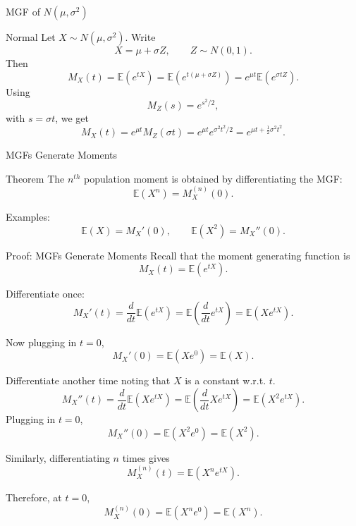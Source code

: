 \begin{frame}{MGF of $N(\mu,\sigma^2)$}

\small

\begin{keybox}{Normal}
Let \(X\sim N(\mu,\sigma^2)\). Write
\[
X=\mu+\sigma Z,
\qquad Z\sim N(0,1).
\]
Then
\[
M_X(t)
=
\mathbb{E}(e^{tX})
=
\mathbb{E}\left(e^{t(\mu+\sigma Z)}\right)
=
e^{\mu t}\mathbb{E}(e^{\sigma t Z}).
\]
Using
\[
M_Z(s)=e^{s^2/2},
\]
with \(s=\sigma t\), we get
\[
M_X(t)
=
e^{\mu t}M_Z(\sigma t)
=
e^{\mu t}e^{\sigma^2t^2/2}
=
{e^{\mu t+\frac12\sigma^2t^2}}.
\]
\end{keybox}

\end{frame}



































\begin{frame}{MGFs Generate Moments}
\begin{keybox}{Theorem}
The $n^{th}$ population moment is obtained by differentiating the MGF:
\[
\mathbb{E}(X^n)=M_X^{(n)}(0).
\]
\end{keybox}

\vspace{0.25cm}

Examples:
\[
\mathbb{E}(X)=M_X'(0),
\qquad
\mathbb{E}(X^2)=M_X''(0).
\]
\end{frame}


\begin{frame}{Proof: MGFs Generate Moments}
Recall that the moment generating function is
\[
M_X(t)=\mathbb{E}(e^{tX}).
\]

Differentiate once:
\[
M_X'(t)
=
\frac{d}{dt}\mathbb{E}(e^{tX})
=
\mathbb{E}\left(\frac{d}{dt}e^{tX}\right)
=
\mathbb{E}(Xe^{tX}).
\]

Now plugging in $t=0$,
\[
M_X'(0)
=
\mathbb{E}(Xe^{0})
=
\mathbb{E}(X).
\]

Differentiate another time noting that $X$ is a constant w.r.t. $t$.
\[
M_X''(t)
=
\frac{d}{dt}\mathbb{E}(Xe^{tX})
=
\mathbb{E}\left(\frac{d}{dt}Xe^{tX}\right) = \mathbb{E}(X^2 e^{tX}).
\]
Plugging in $t=0$,
\[
M_X''(0)
=
\mathbb{E}(X^2 e^0)
=
\mathbb{E}(X^2).
\]

Similarly, differentiating $n$ times gives
\[
M_X^{(n)}(t)=\mathbb{E}(X^n e^{tX}).
\]

Therefore, at $t=0$,
\[
M_X^{(n)}(0)
=
\mathbb{E}(X^n e^0)
=
\mathbb{E}(X^n).
\]
\end{frame}



